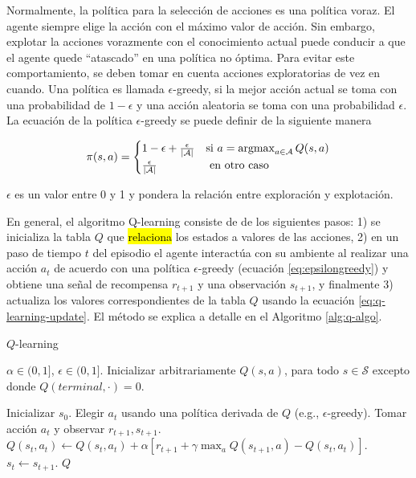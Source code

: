 Normalmente, la política para la selección de acciones es una política voraz. El agente
siempre elige la acción con el máximo valor de acción. Sin embargo, explotar la acciones vorazmente con el conocimiento actual puede conducir a que el
agente quede ``atascado'' en una política no óptima. Para evitar 
este comportamiento, se deben tomar en cuenta acciones exploratorias de vez en cuando.
Una política es llamada $\epsilon$-greedy, si la mejor acción actual se toma 
con una probabilidad de $1-\epsilon$ y una acción aleatoria se toma con una 
probabilidad $\epsilon$. La ecuación de la política $\epsilon$-greedy
se puede definir de la siguiente manera

\begin{equation}\label{eq:epsilongreedy}
\pi(s,a) = 
  \begin{cases} 
      1 - \epsilon + \frac{\epsilon}{|\mathcal{A}|} & \mbox{si } a= 
      \operatorname*{argmax}_{a \in \mathcal{A}} 
      Q(s,a)   \\
      \frac{\epsilon}{|\mathcal{A}|} & \mbox{ en otro caso }
  \end{cases}
\end{equation}

$\epsilon$ es un valor entre 0 y 1 y pondera la relación entre
exploración y explotación.

En general, el algoritmo Q-learning consiste de de los siguientes pasos:
1) se inicializa la tabla $Q$ que \hl{relaciona} los estados a valores de las acciones,
2) en un paso de tiempo $t$ del episodio el agente interactúa con su ambiente al realizar una acción $a_t$ de acuerdo con una política $\epsilon$-greedy (ecuación \ref{eq:epsilongreedy}) y obtiene una señal de recompensa $r_{t+1}$ y una observación $s_{t+1}$, y finalmente 3) actualiza los valores
correspondientes de la tabla $Q$ usando la ecuación \ref{eq:q-learning-update}. El método
se explica a detalle en el Algoritmo \ref{alg:q-algo}.

\begin{mialgoritmo}[H]
  	\caption{$Q$-learning}
	\label{alg:q-algo}
  \begin{algorithmic}[1]
  \REQUIRE $\alpha \in (0,1]$, $\epsilon \in (0, 1]$.
  \STATE Inicializar arbitrariamente $Q(s,a)$, para todo $s\in \mathcal{S}$ excepto donde $Q(terminal, \cdot) = 0$.
  
    \STATE Inicializar $s_0$.
    \STATE Elegir $a_t$ usando una política derivada de $Q$ (e.g., $\epsilon$-greedy).
    \STATE Tomar acción $a_t$ y observar $r_{t+1}, s_{t+1}$.
    \STATE $Q(s_t, a_t) \leftarrow Q(s_t, a_t) + \alpha [r_{t+1} + \gamma \max_a Q(s_{t+1}, a) - Q(s_t, a_t)]$.
    \STATE $s_t \leftarrow s_{t+1}$.
    \ENDFOR
  \ENDFOR
  \RETURN $Q$
  \end{algorithmic}
\end{mialgoritmo}

